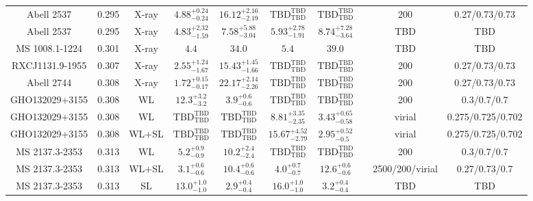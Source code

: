 \begin{table}
\begin{tabular}{cccccccccc}
Abell 2537 & 0.295 & X-ray & ${4.88}^{+0.24}_{-0.24}$ & ${16.12}^{+2.16}_{-2.19}$ & ${\mathrm{TBD}}^{\mathrm{TBD}}_{\mathrm{TBD}}$ & ${\mathrm{TBD}}^{\mathrm{TBD}}_{\mathrm{TBD}}$ & \citet{BA14.1} & 200 & 0.27/0.73/0.73 \\
Abell 2537 & 0.295 & X-ray & ${4.83}^{+2.32}_{-1.59}$ & ${7.58}^{+5.88}_{-3.04}$ & ${5.93}^{+2.78}_{-1.91}$ & ${8.74}^{+7.28}_{-3.64}$ & \citet{SC06.1} & TBD & TBD \\
MS 1008.1-1224 & 0.301 & X-ray & ${4.4}^{}_{}$ & ${34.0}^{}_{}$ & ${5.4}^{}_{}$ & ${39.0}^{}_{}$ & \citet{MO99.1} & TBD & TBD \\
RXCJ1131.9-1955 & 0.307 & X-ray & ${2.55}^{+1.24}_{-1.67}$ & ${15.43}^{+1.45}_{-1.66}$ & ${\mathrm{TBD}}^{\mathrm{TBD}}_{\mathrm{TBD}}$ & ${\mathrm{TBD}}^{\mathrm{TBD}}_{\mathrm{TBD}}$ & \citet{BA14.1} & 200 & 0.27/0.73/0.73 \\
Abell 2744 & 0.308 & X-ray & ${1.72}^{+0.15}_{-0.17}$ & ${22.17}^{+2.14}_{-2.26}$ & ${\mathrm{TBD}}^{\mathrm{TBD}}_{\mathrm{TBD}}$ & ${\mathrm{TBD}}^{\mathrm{TBD}}_{\mathrm{TBD}}$ & \citet{BA14.1} & 200 & 0.27/0.73/0.73 \\
GHO132029+3155 & 0.308 & WL & ${12.3}^{+3.2}_{-3.2}$ & ${3.9}^{+0.6}_{-0.6}$ & ${\mathrm{TBD}}^{\mathrm{TBD}}_{\mathrm{TBD}}$ & ${\mathrm{TBD}}^{\mathrm{TBD}}_{\mathrm{TBD}}$ & \citet{SE14.1} & 200 & 0.3/0.7/0.7 \\
GHO132029+3155 & 0.308 & WL & ${\mathrm{TBD}}^{\mathrm{TBD}}_{\mathrm{TBD}}$ & ${\mathrm{TBD}}^{\mathrm{TBD}}_{\mathrm{TBD}}$ & ${8.81}^{+3.35}_{-2.35}$ & ${3.43}^{+0.65}_{-0.58}$ & \citet{OG12.1} & virial & 0.275/0.725/0.702 \\
GHO132029+3155 & 0.308 & WL+SL & ${\mathrm{TBD}}^{\mathrm{TBD}}_{\mathrm{TBD}}$ & ${\mathrm{TBD}}^{\mathrm{TBD}}_{\mathrm{TBD}}$ & ${15.67}^{+4.52}_{-2.79}$ & ${2.95}^{+0.52}_{-0.5}$ & \citet{OG12.1} & virial & 0.275/0.725/0.702 \\
MS 2137.3-2353 & 0.313 & WL & ${5.2}^{+0.9}_{-0.9}$ & ${10.2}^{+2.4}_{-2.4}$ & ${\mathrm{TBD}}^{\mathrm{TBD}}_{\mathrm{TBD}}$ & ${\mathrm{TBD}}^{\mathrm{TBD}}_{\mathrm{TBD}}$ & \citet{SE14.1} & 200 & 0.3/0.7/0.7 \\
MS 2137.3-2353 & 0.313 & WL+SL & ${3.1}^{+0.6}_{-0.6}$ & ${10.4}^{+0.6}_{-0.6}$ & ${4.0}^{+0.7}_{-0.7}$ & ${12.6}^{+0.6}_{-0.6}$ & \citet{ME14.1} & 2500/200/virial & 0.27/0.73/0.7 \\
MS 2137.3-2353 & 0.313 & SL & ${13.0}^{+1.0}_{-1.0}$ & ${2.9}^{+0.4}_{-0.4}$ & ${16.0}^{+1.0}_{-1.0}$ & ${3.2}^{+0.4}_{-0.4}$ & \citet{CO07.1} & TBD & TBD \\

\end{tabular}
\end{table}
